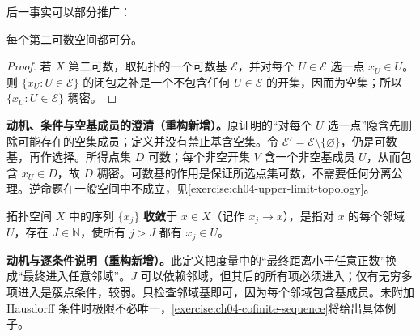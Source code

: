 \documentclass[../../main.tex]{subfiles}%
\begin{document}
后一事实可以部分推广：
\begin{proposition}\label{proposition:ch04-second-countable-separable}
每个第二可数空间都可分。
\end{proposition}
\begin{proof}
若 $X$ 第二可数，取拓扑的一个可数基 $\mathcal E$，并对每个 $U\in\mathcal E$ 选一点 $x_U\in U$。则 $\{x_U:U\in\mathcal E\}$ 的闭包之补是一个不包含任何 $U\in\mathcal E$ 的开集，因而为空集；所以 $\{x_U:U\in\mathcal E\}$ 稠密。
\end{proof}
\begin{remark}
\textbf{动机、条件与空基成员的澄清（重构新增）。}原证明的“对每个 $U$ 选一点”隐含先删除可能存在的空集成员；定义并没有禁止基含空集。令 $\mathcal E'=\mathcal E\setminus\{\varnothing\}$，仍是可数基，再作选择。所得点集 $D$ 可数；每个非空开集 $V$ 含一个非空基成员 $U$，从而包含 $x_U\in D$，故 $D$ 稠密。可数基的作用是保证所选点集可数，不需要任何分离公理。逆命题在一般空间中不成立，见\cref{exercise:ch04-upper-limit-topology}。
\end{remark}
\begin{definition}[序列收敛]\label{definition:ch04-sequence-convergence}
拓扑空间 $X$ 中的序列 $\{x_j\}$ \textbf{收敛}于 $x\in X$（记作 $x_j\to x$），是指对 $x$ 的每个邻域 $U$，存在 $J\in\mathbb N$，使所有 $j>J$ 都有 $x_j\in U$。
\end{definition}
\begin{remark}
\textbf{动机与逐条件说明（重构新增）。}此定义把度量中的“最终距离小于任意正数”换成“最终进入任意邻域”。$J$ 可以依赖邻域，但其后的所有项必须进入；仅有无穷多项进入是簇点条件，较弱。只检查邻域基即可，因为每个邻域包含基成员。未附加 Hausdorff 条件时极限不必唯一，\cref{exercise:ch04-cofinite-sequence}将给出具体例子。
\end{remark}
\end{document}
